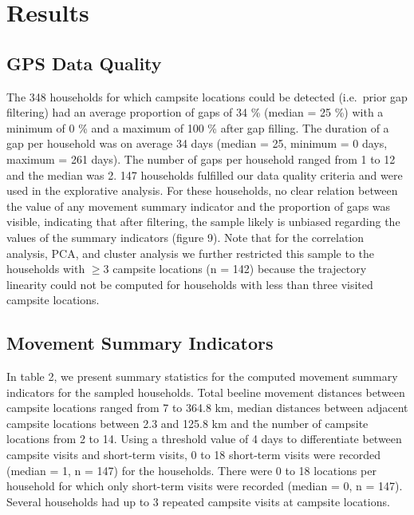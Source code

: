 \documentclass[]{elsarticle} %
\begin{document}
\hypertarget{results}{%
\section{Results}\label{results}}

\hypertarget{gps-data-quality}{%
\subsection{GPS Data Quality}\label{gps-data-quality}}

The 348 households for which campsite locations could be detected
(i.e.~prior gap filtering) had an average proportion of gaps of 34 \%
(median = 25 \%) with a minimum of 0 \% and a maximum of 100 \% after
gap filling. The duration of a gap per household was on average 34 days
(median = 25, minimum = 0 days, maximum = 261 days). The number of gaps
per household ranged from 1 to 12 and the median was 2. 147 households
fulfilled our data quality criteria and were used in the explorative
analysis. For these households, no clear relation between the value of
any movement summary indicator and the proportion of gaps was visible,
indicating that after filtering, the sample likely is unbiased regarding
the values of the summary indicators (figure 9). Note that for the
correlation analysis, PCA, and cluster analysis we further restricted
this sample to the households with \(\ge 3\) campsite locations (n =
142) because the trajectory linearity could not be computed for
households with less than three visited campsite locations.

\hypertarget{movement-summary-indicators}{%
\subsection{Movement Summary
Indicators}\label{movement-summary-indicators}}

In table 2, we present summary statistics for the computed movement
summary indicators for the sampled households. Total beeline movement
distances between campsite locations ranged from 7 to 364.8 km, median
distances between adjacent campsite locations between 2.3 and 125.8 km
and the number of campsite locations from 2 to 14. Using a threshold
value of 4 days to differentiate between campsite visits and short-term
visits, 0 to 18 short-term visits were recorded (median = 1, n = 147)
for the households. There were 0 to 18 locations per household for which
only short-term visits were recorded (median = 0, n = 147). Several
households had up to 3 repeated campsite visits at campsite locations.
\end{document}
